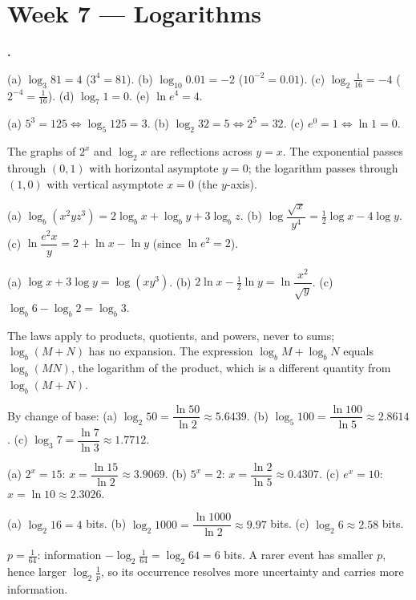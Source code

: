 \documentclass[12pt]{book}
\newcounter{soln}[section]
\newenvironment{solutions}{%
  \setcounter{soln}{0}%
  \begin{list}{\textbf{\arabic{soln}.}}{%
    \usecounter{soln}\setlength{\leftmargin}{2.2em}\setlength{\itemsep}{10pt}}%
}{\end{list}}
\begin{document}
\section*{Week 7 — Logarithms}
\setcounter{section}{7}

\begin{solutions}
\item (a) $\log_3 81=4$ ($3^4=81$). (b) $\log_{10}0.01=-2$ ($10^{-2}=0.01$). (c)
$\log_2\tfrac1{16}=-4$ ($2^{-4}=\tfrac1{16}$). (d) $\log_7 1=0$. (e) $\ln e^4=4$.

\item (a) $5^3=125 \iff \log_5 125=3$. (b) $\log_2 32=5 \iff 2^5=32$. (c)
$e^0=1 \iff \ln 1=0$.

\item The graphs of $2^x$ and $\log_2 x$ are reflections across $y=x$. The exponential
passes through $(0,1)$ with horizontal asymptote $y=0$; the logarithm passes through
$(1,0)$ with vertical asymptote $x=0$ (the $y$-axis).

\item (a) $\log_b(x^2yz^3)=2\log_b x+\log_b y+3\log_b z$. (b)
$\log\dfrac{\sqrt{x}}{y^4}=\tfrac12\log x-4\log y$. (c)
$\ln\dfrac{e^2 x}{y}=2+\ln x-\ln y$ (since $\ln e^2=2$).

\item (a) $\log x+3\log y=\log(xy^3)$. (b) $2\ln x-\tfrac12\ln y=\ln\dfrac{x^2}{\sqrt
y}$. (c) $\log_b 6-\log_b 2=\log_b 3$.

\item The laws apply to products, quotients, and powers, never to sums; $\log_b(M+N)$
has no expansion. The expression $\log_b M+\log_b N$ equals $\log_b(MN)$, the logarithm
of the product, which is a different quantity from $\log_b(M+N)$.

\item By change of base: (a) $\log_2 50=\dfrac{\ln 50}{\ln 2}\approx5.6439$. (b)
$\log_5 100=\dfrac{\ln 100}{\ln 5}\approx2.8614$. (c)
$\log_3 7=\dfrac{\ln 7}{\ln 3}\approx1.7712$.

\item (a) $2^x=15$: $x=\dfrac{\ln 15}{\ln 2}\approx3.9069$. (b) $5^x=2$:
$x=\dfrac{\ln 2}{\ln 5}\approx0.4307$. (c) $e^x=10$: $x=\ln 10\approx2.3026$.

\item (a) $\log_2 16=4$ bits. (b) $\log_2 1000=\dfrac{\ln 1000}{\ln 2}\approx9.97$
bits. (c) $\log_2 6\approx2.58$ bits.

\item $p=\tfrac1{64}$: information $-\log_2\tfrac1{64}=\log_2 64=6$ bits. A rarer event
has smaller $p$, hence larger $\log_2\tfrac1p$, so its occurrence resolves more
uncertainty and carries more information.


\end{solutions}
\end{document}
